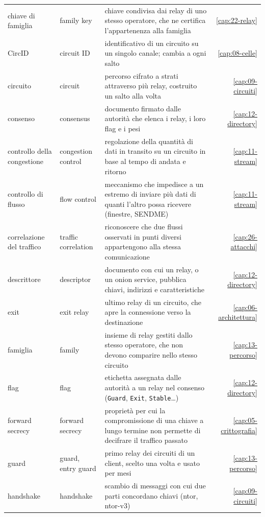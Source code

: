 {\begin{longtable}{@{}>{\raggedright\arraybackslash}p{3.2cm}>{\raggedright\arraybackslash}p{3.2cm}>{\raggedright\arraybackslash}p{6.6cm}r@{}}
chiave di famiglia & family key & chiave condivisa dai relay di uno stesso operatore, che ne certifica l'appartenenza alla famiglia & \ref{cap:22-relay} \\
CircID & circuit ID & identificativo di un circuito su un singolo canale; cambia a ogni salto & \ref{cap:08-celle} \\
circuito & circuit & percorso cifrato a strati attraverso più relay, costruito un salto alla volta & \ref{cap:09-circuiti} \\
consenso & consensus & documento firmato dalle autorità che elenca i relay, i loro flag e i pesi & \ref{cap:12-directory} \\
controllo della congestione & congestion control & regolazione della quantità di dati in transito su un circuito in base al tempo di andata e ritorno & \ref{cap:11-stream} \\
controllo di flusso & flow control & meccanismo che impedisce a un estremo di inviare più dati di quanti l'altro possa ricevere (finestre, SENDME) & \ref{cap:11-stream} \\
correlazione del traffico & traffic correlation & riconoscere che due flussi osservati in punti diversi appartengono alla stessa comunicazione & \ref{cap:26-attacchi} \\
descrittore & descriptor & documento con cui un relay, o un onion service, pubblica chiavi, indirizzi e caratteristiche & \ref{cap:12-directory} \\
exit & exit relay & ultimo relay di un circuito, che apre la connessione verso la destinazione & \ref{cap:06-architettura} \\
famiglia & family & insieme di relay gestiti dallo stesso operatore, che non devono comparire nello stesso circuito & \ref{cap:13-percorso} \\
flag & flag & etichetta assegnata dalle autorità a un relay nel consenso (\texttt{Guard}, \texttt{Exit}, \texttt{Stable}\ldots) & \ref{cap:12-directory} \\
forward secrecy & forward secrecy & proprietà per cui la compromissione di una chiave a lungo termine non permette di decifrare il traffico passato & \ref{cap:05-crittografia} \\
guard & guard, entry guard & primo relay dei circuiti di un client, scelto una volta e usato per mesi & \ref{cap:13-percorso} \\
handshake & handshake & scambio di messaggi con cui due parti concordano chiavi (ntor, ntor-v3) & \ref{cap:09-circuiti} \\

\end{longtable}}
